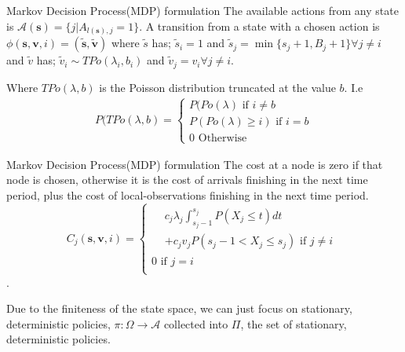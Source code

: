 \documentclass[10pt]{beamer}
\begin{document}
\begin{frame}{Markov Decision Process(MDP) formulation}
The available actions from any state is $\mathcal{A}(\bm{s})=\{j | A_{l(\bm{s}),j}=1 \}$. A transition from a state with a chosen action is $\phi(\bm{s},\bm{v},i)=(\widetilde{\bm{s}},\widetilde{\bm{v}})$ where $\widetilde{s}$ has; $\widetilde{s}_{i}=1$ and $\widetilde{s}_{j}=\min \{s_{j}+1,B_{j}+1 \} \forall j \neq i$ and $\widetilde{v}$ has; $\widetilde{v}_{i} \sim TPo(\lambda_{i},b_{i})$ and  $\widetilde{v}_{j}=v_{i} \forall j \neq i$.

Where $TPo(\lambda,b)$ is the Poisson distribution truncated at the value $b$. I.e
\begin{align*}
P(TPo(\lambda,b)=\begin{cases}
P(Po(\lambda) \text{ if } i \neq b \\
P(Po(\lambda) \geq i) \text{ if } i=b \\
0 \text{ Otherwise}
\end{cases}
\end{align*}

\end{frame}

\begin{frame}{Markov Decision Process(MDP) formulation}
The cost at a node is zero if that node is chosen, otherwise it is the cost of arrivals finishing in the next time period, plus the cost of local-observations finishing in the next time period.
\
$$C_{j}(\bm{s},\bm{v},i)=\begin{cases}
\begin{split}
&c_{j} \lambda_{j} \int_{s_{j}-1}^{s_{j}} P(X_{j} \leq t) dt \\
&+ c_{j}v_{j}P(s_{j}-1 < X_{j} \leq s_{j}) \text{ if } j \neq i 
\end{split} \\
0 \text{ if } j=i \\
\end{cases}$$.

Due to the finiteness of the state space, we can just focus on stationary, deterministic policies, $\pi: \Omega \rightarrow \mathcal{A}$ collected into $\Pi$, the set of stationary, deterministic policies.
\end{frame}
\end{document}
